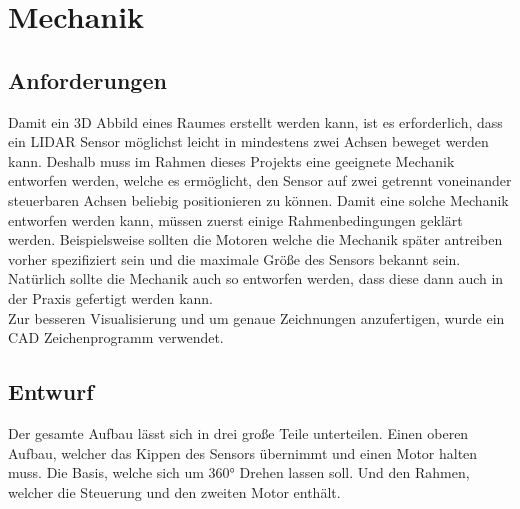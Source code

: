 \chapter{Mechanik}\label{chap:mechanik}

\section{Anforderungen}
Damit ein \acs{3D} Abbild eines Raumes erstellt werden kann, ist es erforderlich, dass ein \ac{LIDAR} Sensor möglichst leicht in mindestens zwei Achsen beweget werden kann. Deshalb muss im Rahmen dieses Projekts eine geeignete Mechanik entworfen werden, welche es ermöglicht, den Sensor auf zwei getrennt voneinander steuerbaren Achsen beliebig positionieren zu können. Damit eine solche Mechanik entworfen werden kann, müssen zuerst einige Rahmenbedingungen geklärt werden. Beispielsweise sollten die Motoren welche die Mechanik später antreiben vorher spezifiziert sein und die maximale Größe des Sensors bekannt sein. Natürlich sollte die Mechanik auch so entworfen werden, dass diese dann auch in der Praxis gefertigt werden kann.\\
Zur besseren Visualisierung und um genaue Zeichnungen anzufertigen, wurde ein \ac{CAD} Zeichenprogramm verwendet. 
\section{Entwurf}
Der gesamte Aufbau lässt sich in drei große Teile unterteilen. Einen oberen Aufbau, welcher das Kippen des Sensors übernimmt und einen Motor halten muss. Die Basis, welche sich um 360° Drehen lassen soll. Und den Rahmen, welcher die Steuerung und den zweiten Motor enthält. 


